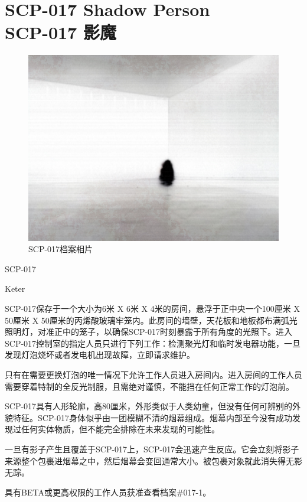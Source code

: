 \chapter[SCP-017 影魔]{
    SCP-017 Shadow Person\\
    SCP-017 影魔
}

\label{chap:SCP-017}

\begin{figure}[H]
    \centering
    \includegraphics[width=0.5\linewidth]{images/SCP-017.jpg}
    \caption*{SCP-017档案相片}
\end{figure}

SCP-017

Keter

SCP-017保存于一个大小为6米 X 6米 X 4米的房间，悬浮于正中央一个100厘米 X 50厘米 X 50厘米的丙烯酸玻璃牢笼内。此房间的墙壁，天花板和地板都布满弧光照明灯，对准正中的笼子，以确保SCP-017时刻暴露于所有角度的光照下。进入SCP-017控制室的指定人员只进行下列工作：检测聚光灯和临时发电器功能，一旦发现灯泡烧坏或者发电机出现故障，立即请求维护。

只有在需要更换灯泡的唯一情况下允许工作人员进入房间内。进入房间的工作人员需要穿着特制的全反光制服，且需绝对谨慎，不能挡在任何正常工作的灯泡前。

SCP-017具有人形轮廓，高80厘米，外形类似于人类幼童，但没有任何可辨别的外貌特征。SCP-017身体似乎由一团模糊不清的烟幕组成。烟幕内部至今没有成功发现过任何实体物质，但不能完全排除在未来发现的可能性。

一旦有影子产生且覆盖于SCP-017上，SCP-017会迅速产生反应。它会立刻将影子来源整个包裹进烟幕之中，然后烟幕会变回通常大小。被包裹对象就此消失得无影无踪。

具有BETA或更高权限的工作人员获准查看档案\#017-1。

